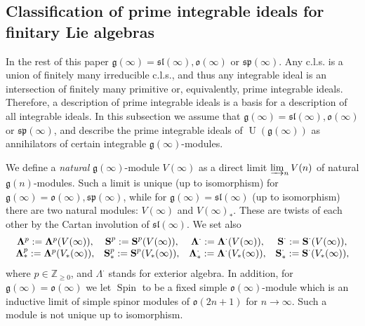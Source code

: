 \documentclass{emsprocart}
\begin{document}
\subsection{Classification of prime integrable ideals for finitary Lie algebras} In the rest of this paper $\mathfrak g(\infty)=\mathfrak{sl}(\infty), \mathfrak o(\infty)$ or $\mathfrak{sp}(\infty)$. Any c.l.s. is a union of finitely many irreducible c.l.s., and thus any integrable ideal is an intersection of finitely many primitive or, equivalently, prime integrable ideals. Therefore, a description of prime integrable ideals is a basis for a description of all integrable ideals. In this subsection we assume that $\mathfrak g(\infty)=\mathfrak{sl}(\infty), \mathfrak o(\infty)$ or $\mathfrak{sp}(\infty)$, and describe the prime integrable ideals of $\operatorname{U}(\mathfrak g(\infty))$ as annihilators of certain integrable $\mathfrak g(\infty)$-modules.

We define a {\it natural} $\mathfrak g(\infty)$-module $V(\infty)$ as a direct limit $\varinjlim_{n} V(n)$ of natural $\mathfrak g(n)$-modules. Such a limit is unique (up to isomorphism) for $\mathfrak g(\infty)=\mathfrak{o}(\infty), \mathfrak{sp}(\infty)$, while for $\mathfrak g(\infty)=\mathfrak{sl}(\infty)$ (up to isomorphism) there are two natural modules: $V(\infty)$ and $V(\infty)_*$. These are twists of each other by the Cartan involution of $\mathfrak{sl}(\infty)$.  %
We set also\begin{equation}\begin{array}{cccc}{\bf \Lambda}^p:={\bf \Lambda}^p(V(\infty)),&\operatorname{\bf S}^p:=\operatorname{\bf S}^p(V(\infty)),&{\bf \Lambda}^\cdot:={\bf \Lambda}^\cdot(V(\infty)),&\operatorname{\bf S}^\cdot:=\operatorname{\bf S}^\cdot(V(\infty)),\\
{\bf \Lambda}^p_*:={\bf \Lambda}^p(V_*(\infty)),&\operatorname{\bf S}^p_*:=\operatorname{\bf S}^p(V_*(\infty)),&{\bf \Lambda}^\cdot_*:={\bf \Lambda}^\cdot(V_*(\infty)),&\operatorname{\bf S}^\cdot_*:=\operatorname{\bf S}^\cdot(V_*(\infty)),\\\end{array}\label{Ebcls}\end{equation}
where $p\in\mathbb Z_{\ge0}$, and $\Lambda^\cdot$ stands for exterior algebra. In addition, for $\mathfrak g(\infty)=\mathfrak{o}(\infty)$ we let $\operatorname{Spin}$ to be a fixed simple $\mathfrak{o}(\infty)$-module which is an inductive limit of simple spinor modules of $\mathfrak o(2n+1)$ for $n\to\infty$. Such a module is not unique up to isomorphism.
\end{document}
